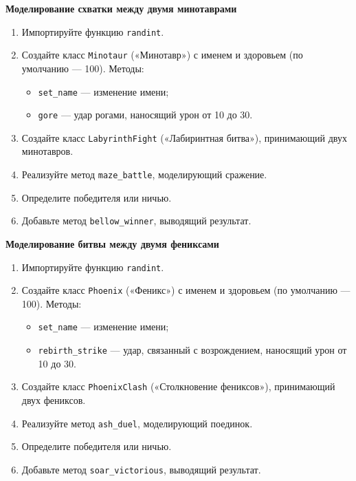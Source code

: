 \item \textbf{Моделирование схватки между двумя минотаврами}

\begin{enumerate}
    \item Импортируйте функцию \texttt{randint}.

    \item Создайте класс \texttt{Minotaur} («Минотавр») с именем и здоровьем (по умолчанию — 100).  
    Методы:
    \begin{itemize}
        \item \texttt{set\_name} — изменение имени;
        \item \texttt{gore} — удар рогами, наносящий урон от 10 до 30.
    \end{itemize}

    \item Создайте класс \texttt{LabyrinthFight} («Лабиринтная битва»), принимающий двух минотавров.

    \item Реализуйте метод \texttt{maze\_battle}, моделирующий сражение.

    \item Определите победителя или ничью.

    \item Добавьте метод \texttt{bellow\_winner}, выводящий результат.
\end{enumerate}

\item \textbf{Моделирование битвы между двумя фениксами}

\begin{enumerate}
    \item Импортируйте функцию \texttt{randint}.

    \item Создайте класс \texttt{Phoenix} («Феникс») с именем и здоровьем (по умолчанию — 100).  
    Методы:
    \begin{itemize}
        \item \texttt{set\_name} — изменение имени;
        \item \texttt{rebirth\_strike} — удар, связанный с возрождением, наносящий урон от 10 до 30.
    \end{itemize}

    \item Создайте класс \texttt{PhoenixClash} («Столкновение фениксов»), принимающий двух фениксов.

    \item Реализуйте метод \texttt{ash\_duel}, моделирующий поединок.

    \item Определите победителя или ничью.

    \item Добавьте метод \texttt{soar\_victorious}, выводящий результат.
\end{enumerate}

